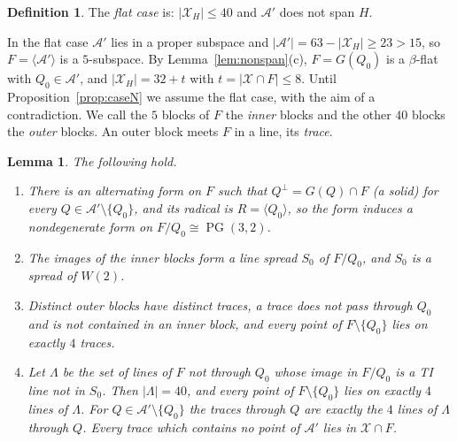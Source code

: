 \documentclass[11pt]{amsart}
\newtheorem{lemma}[theorem]{Lemma}
\theoremstyle{definition}
\newtheorem{definition}[theorem]{Definition}
\newcommand{\X}{\mathcal{X}}
\newcommand{\A}{\mathcal{A}}
\newcommand{\PG}{\operatorname{PG}}
\begin{document}
\begin{definition}
The \emph{flat case} is: $|\X_H|\le40$ and $\A'$ does not span $H$.
\end{definition}

In the flat case $\A'$ lies in a proper subspace and $|\A'|=63-|\X_H|\ge23>15$, so $F=\langle\A'\rangle$ is a $5$-subspace. By Lemma~\ref{lem:nonspan}(c), $F=G(Q_0)$ is a $\beta$-flat with $Q_0\in\A'$, and $|\X_H|=32+t$ with $t=|\X\cap F|\le8$. Until Proposition~\ref{prop:caseN} we assume the flat case, with the aim of a contradiction. We call the $5$ blocks of $F$ the \emph{inner} blocks and the other $40$ blocks the \emph{outer} blocks. An outer block meets $F$ in a line, its \emph{trace}.

\begin{lemma}\label{lem:caseNform}
The following hold.
\begin{enumerate}[label=(\alph*)]
\item There is an alternating form on $F$ such that $Q^\perp=G(Q)\cap F$ \textup{(}a solid\textup{)} for every $Q\in\A'\setminus\{Q_0\}$, and its radical is $R=\langle Q_0\rangle$, so the form induces a nondegenerate form on $F/Q_0\cong\PG(3,2)$.
\item The images of the inner blocks form a line spread $S_0$ of $F/Q_0$, and $S_0$ is a spread of $W(2)$.
\item Distinct outer blocks have distinct traces, a trace does not pass through $Q_0$ and is not contained in an inner block, and every point of $F\setminus\{Q_0\}$ lies on exactly $4$ traces.
\item Let $\Lambda$ be the set of lines of $F$ not through $Q_0$ whose image in $F/Q_0$ is a TI line not in $S_0$. Then $|\Lambda|=40$, and every point of $F\setminus\{Q_0\}$ lies on exactly $4$ lines of $\Lambda$. For $Q\in\A'\setminus\{Q_0\}$ the traces through $Q$ are exactly the $4$ lines of $\Lambda$ through $Q$. Every trace which contains no point of $\A'$ lies in $\X\cap F$.
\end{enumerate}
\end{lemma}
\end{document}
